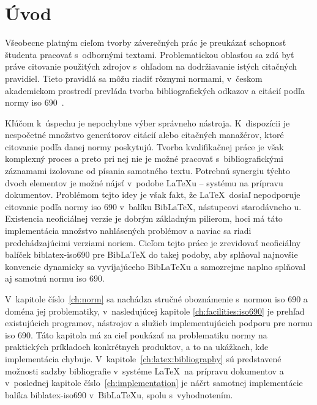 \documentclass[
  color,
  table,
  nolof,
  oneside,
]{fithesis3}
\begin{document}



\chapter{Úvod}

Všeobecne platným cieľom tvorby záverečných prác je preukázať schopnosť študenta pracovať s~odbornými textami. Problematickou oblasťou sa zdá byť práve citovanie použitých zdrojov s~ohľadom na dodržiavanie istých citačných pravidiel. Tieto pravidlá sa môžu riadiť rôznymi normami, v~českom akademickom prostredí prevláda tvorba bibliografických odkazov a citácií podľa normy \gls{iso} 690~\cite{Kratochvil2011}.

Kľúčom k~úspechu je nepochybne výber správneho nástroja. K~dispozícii je nespočetné množstvo generátorov citácií alebo citačných manažérov, ktoré citovanie podľa danej normy poskytujú. Tvorba kvalifikačnej práce je však komplexný proces a preto pri nej nie je možné pracovať s~bibliografickými záznamami izolovane od písania samotného textu. Potrebnú synergiu týchto dvoch elementov je možné nájsť v~podobe \LaTeX u -- systému na prípravu dokumentov. Problémom tejto idey je však fakt, že \LaTeX\ dosiaľ nepodporuje citovanie podľa normy \gls{iso} 690 v~balíku BibLaTeX, nástupcovi starodávneho \BibTeX u. Existencia neoficiálnej verzie je dobrým základným pilierom, hoci má táto implementácia množstvo nahlásených problémov a naviac sa riadi predchádzajúcimi verziami noriem. Cieľom tejto práce je zrevidovať neoficiálny balíček \textsf{biblatex-iso690} pre BibLaTeX do takej podoby, aby splňoval najnovšie konvencie dynamicky sa vyvíjajúceho BibLaTeXu a samozrejme naplno splňoval aj samotnú normu \gls{iso} 690.

V~kapitole číslo~\ref{ch:norm} sa nachádza stručné oboznámenie s~normou \gls{iso} 690 a doména jej problematiky, v~nasledujúcej kapitole \ref{ch:facilities:iso690} je prehľad existujúcich programov, nástrojov a služieb implementujúcich podporu pre normu \gls{iso} 690. Táto kapitola má za cieľ poukázať na problematiku normy na praktických príkladoch konkrétnych produktov, a to na ukážkach, kde implementácia chybuje. V~kapitole~\ref{ch:latex:bibliography} sú predstavené možnosti sadzby bibliografie v~systéme \LaTeX\ na prípravu dokumentov a v~poslednej kapitole číslo~\ref{ch:implementation} je náčrt samotnej implementácie balíka \textsf{biblatex-iso690} v~BibLaTeXu, spolu s~vyhodnotením.
\end{document}
